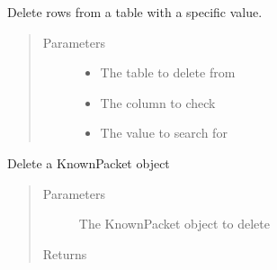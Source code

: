 \documentclass[letterpaper,10pt,english]{sphinxmanual}
\begin{document}
\begin{fulllineitems}
\begin{fulllineitems}
\begin{quote}
\begin{description}
\begin{itemize}
\end{itemize}

\end{description}\end{quote}

\end{fulllineitems}


\begin{fulllineitems}
\label{\detokenize{src:src.Database.Database.deleteFromTableByValue}}
Delete rows from a table with a specific value.
\begin{quote}\begin{description}
\item[{Parameters}] \leavevmode\begin{itemize}
\item {} 
 \textendash{} The table to delete from

\item {} 
 \textendash{} The column to check

\item {} 
 \textendash{} The value to search for

\end{itemize}

\end{description}\end{quote}

\end{fulllineitems}


\begin{fulllineitems}
\label{\detokenize{src:src.Database.Database.deleteKnownPacket}}
Delete a KnownPacket object
\begin{quote}\begin{description}
\item[{Parameters}] \leavevmode
{} \textendash{} The KnownPacket object to delete

\item[{Returns}] \leavevmode


\end{description}\end{quote}


\end{fulllineitems}
\end{fulllineitems}
\end{document}
